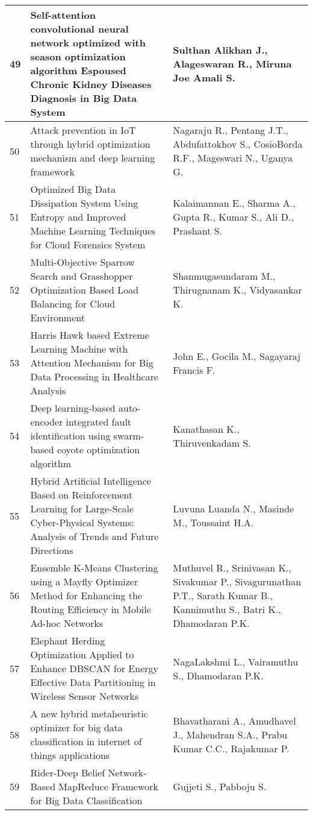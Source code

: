 \begin{landscape}
\begin{longtable}{|p{0.5cm}|p{9cm}|p{7cm}|}
    49 & Self-attention convolutional neural network optimized with season optimization algorithm Espoused Chronic Kidney Diseases Diagnosis in Big Data System & Sulthan Alikhan J., Alageswaran R., Miruna Joe Amali S. \\
    \hline
    50 & Attack prevention in IoT through hybrid optimization mechanism and deep learning framework & Nagaraju R., Pentang J.T., Abdufattokhov S., CosioBorda R.F., Mageswari N., Uganya G. \\
    \hline
    51 & Optimized Big Data Dissipation System Using Entropy and Improved Machine Learning Techniques for Cloud Forensics System & Kalaimannan E., Sharma A., Gupta R., Kumar S., Ali D., Prashant S. \\
    \hline
    52 & Multi-Objective Sparrow Search and Grasshopper Optimization Based Load Balancing for Cloud Environment & Shanmugasundaram M., Thirugnanam K., Vidyasankar K. \\
    \hline
    53 & Harris Hawk based Extreme Learning Machine with Attention Mechanism for Big Data Processing in Healthcare Analysis & John E., Gocila M., Sagayaraj Francis F. \\
    \hline
    54 & Deep learning-based auto-encoder integrated fault identification using swarm-based coyote optimization algorithm & Kanathasan K., Thiruvenkadam S. \\
    \hline
    55 & Hybrid Artificial Intelligence Based on Reinforcement Learning for Large-Scale Cyber-Physical Systems: Analysis of Trends and Future Directions & Luvuna Luanda N., Masinde M., Toussaint H.A. \\
    \hline
    56 & Ensemble K-Means Clustering using a Mayfly Optimizer Method for Enhancing the Routing Efficiency in Mobile Ad-hoc Networks & Muthuvel R., Srinivasan K., Sivakumar P., Sivagurunathan P.T., Sarath Kumar B., Kannimuthu S., Batri K., Dhamodaran P.K. \\
    \hline
    57 & Elephant Herding Optimization Applied to Enhance DBSCAN for Energy Effective Data Partitioning in Wireless Sensor Networks & NagaLakshmi L., Vairamuthu S., Dhamodaran P.K. \\
    \hline
    58 & A new hybrid metaheuristic optimizer for big data classification in internet of things applications & Bhavatharani A., Amudhavel J., Mahendran S.A., Prabu Kumar C.C., Rajakumar P. \\
    \hline
    59 & Rider-Deep Belief Network-Based MapReduce Framework for Big Data Classification & Gujjeti S., Pabboju S. \\

\end{longtable}
\end{landscape}
